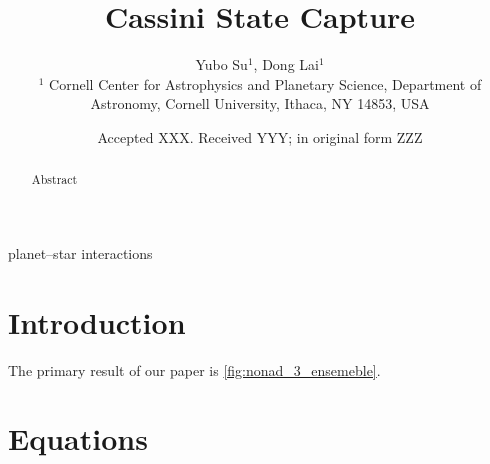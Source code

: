\documentclass[
        fleqn,
        usenatbib,
    ]{mnras}
\title[Cassini State Capture]{Cassini State Capture}
\author[Y. Su et\ al.]{
Yubo Su$^1$,
Dong Lai$^1$
\\
$^1$ Cornell Center for Astrophysics and Planetary Science, Department of
Astronomy, Cornell University, Ithaca, NY 14853, USA
}
\date{Accepted XXX\@. Received YYY\@; in original form ZZZ}
\begin{document}
\label{firstpage}
\pagerange{\pageref{firstpage}--\pageref{lastpage}}
\renewcommand*{\sectionautorefname}{Section}
\maketitle


\begin{abstract}
    Abstract
\end{abstract}

\begin{keywords}
planet--star interactions %
\end{keywords}

\section{Introduction}

The primary result of our paper is \autoref{fig:nonad_3_ensemeble}.

\section{Equations}\label{s:eq}
\end{document}
